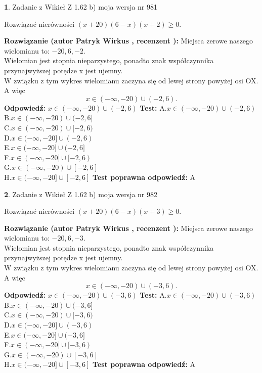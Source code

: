 \documentclass[12pt, a4paper]{article}
\theoremstyle{definition} %
\newtheorem{zad}{}
\newcommand{\zadStart}[1]{\begin{zad}#1\newline}
\newcommand{\zadStop}{\end{zad}}
\newcommand{\rozwStart}[2]{\noindent \textbf{Rozwiązanie (autor #1 , recenzent #2): }\newline}
\newcommand{\rozwStop}{\newline}
\newcommand{\odpStart}{\noindent \textbf{Odpowiedź:}\newline}
\newcommand{\odpStop}{\newline}
\newcommand{\testStart}{\noindent \textbf{Test:}\newline}
\newcommand{\testStop}{\newline}
\newcommand{\kluczStart}{\noindent \textbf{Test poprawna odpowiedź:}\newline}
\newcommand{\kluczStop}{\newline}
\begin{document}
\zadStart{Zadanie z Wikieł Z 1.62 b) moja wersja nr 981}

Rozwiązać nierówności $(x+20)(6-x)(x+2)\ge0$.
\zadStop
\rozwStart{Patryk Wirkus}{}
Miejsca zerowe naszego wielomianu to: $-20, 6, -2$.\\
Wielomian jest stopnia nieparzystego, ponadto znak współczynnika przy\linebreak najwyższej potędze x jest ujemny.\\ W związku z tym wykres wielomianu zaczyna się od lewej strony powyżej osi OX. A więc $$x \in (-\infty,-20) \cup (-2,6).$$
\rozwStop
\odpStart
$x \in (-\infty,-20) \cup (-2,6)$
\odpStop
\testStart
A.$x \in (-\infty,-20) \cup (-2,6)$\\
B.$x \in (-\infty,-20) \cup (-2,6]$\\
C.$x \in (-\infty,-20) \cup [-2,6)$\\
D.$x \in (-\infty,-20] \cup (-2,6)$\\
E.$x \in (-\infty,-20] \cup (-2,6]$\\
F.$x \in (-\infty,-20] \cup [-2,6)$\\
G.$x \in (-\infty,-20) \cup [-2,6]$\\
H.$x \in (-\infty,-20] \cup [-2,6]$
\testStop
\kluczStart
A
\kluczStop



\zadStart{Zadanie z Wikieł Z 1.62 b) moja wersja nr 982}

Rozwiązać nierówności $(x+20)(6-x)(x+3)\ge0$.
\zadStop
\rozwStart{Patryk Wirkus}{}
Miejsca zerowe naszego wielomianu to: $-20, 6, -3$.\\
Wielomian jest stopnia nieparzystego, ponadto znak współczynnika przy\linebreak najwyższej potędze x jest ujemny.\\ W związku z tym wykres wielomianu zaczyna się od lewej strony powyżej osi OX. A więc $$x \in (-\infty,-20) \cup (-3,6).$$
\rozwStop
\odpStart
$x \in (-\infty,-20) \cup (-3,6)$
\odpStop
\testStart
A.$x \in (-\infty,-20) \cup (-3,6)$\\
B.$x \in (-\infty,-20) \cup (-3,6]$\\
C.$x \in (-\infty,-20) \cup [-3,6)$\\
D.$x \in (-\infty,-20] \cup (-3,6)$\\
E.$x \in (-\infty,-20] \cup (-3,6]$\\
F.$x \in (-\infty,-20] \cup [-3,6)$\\
G.$x \in (-\infty,-20) \cup [-3,6]$\\
H.$x \in (-\infty,-20] \cup [-3,6]$
\testStop
\kluczStart
A
\kluczStop
\end{document}
